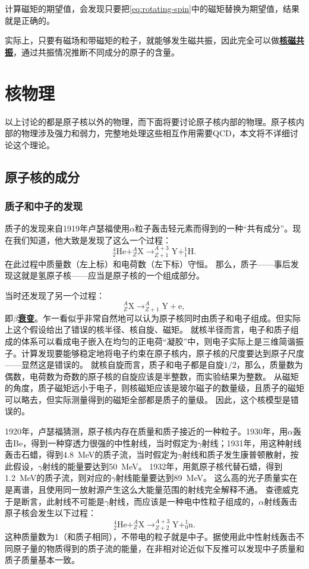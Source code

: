 \documentclass[UTF8, a4paper]{ctexart}
\newcommand*{\nuclear}[3]{^{#2}_{#3}\text{#1}}
\newcommand*{\concept}[1]{\underline{\textbf{#1}}}
\begin{document}
计算磁矩的期望值，会发现只要把\eqref{eq:rotating-spin}中的磁矩替换为期望值，结果就是正确的。

实际上，只要有磁场和带磁矩的粒子，就能够发生磁共振，因此完全可以做\concept{核磁共振}，通过共振情况推断不同成分的原子的含量。

\section{核物理}

以上讨论的都是原子核以外的物理，而下面将要讨论原子核内部的物理。原子核内部的物理涉及强力和弱力，完整地处理这些相互作用需要QCD，本文将不详细讨论这个理论。

\subsection{原子核的成分}

\subsubsection{质子和中子的发现}

质子的发现来自1919年卢瑟福使用$\alpha$粒子轰击轻元素而得到的一种“共有成分”。现在我们知道，他大致是发现了这么一个过程：
\[
    \nuclear{He}{4}{2} + \nuclear{X}{A}{Z} \longrightarrow \nuclear{Y}{A+3}{Z+1} + \nuclear{H}{1}{1}.
\]
在此过程中质量数（左上标）和电荷数（左下标）守恒。
那么，质子——事后发现这就是氢原子核——应当是原子核的一个组成部分。

当时还发现了另一个过程：
\[
    \nuclear{X}{A}{Z} \longrightarrow \nuclear{Y}{A}{Z+1} + \text{e},
\]
即\concept{$\beta$衰变}。乍一看似乎非常自然地可以认为原子核同时由质子和电子组成。但实际上这个假设给出了错误的核半径、核自旋、磁矩。
就核半径而言，电子和质子组成的体系可以看成电子嵌入在均匀的正电荷“凝胶”中，则电子实际上是三维简谐振子。计算发现要能够稳定地将电子约束在原子核内，原子核的尺度要达到原子尺度——显然这是错误的。
就核自旋而言，质子和电子都是自旋$1/2$，那么，质量数为偶数，电荷数为奇数的原子核的自旋应该是半整数，而实验结果为整数。
从磁矩的角度，质子磁矩远小于电子，则核磁矩应该是玻尔磁子的数量级，且质子的磁矩可以略去，但实际测量得到的磁矩全部都是质子的量级。
因此，这个核模型是错误的。

1920年，卢瑟福猜测，原子核内存在质量和质子接近的一种粒子。1930年，用$\alpha$轰击Be，得到一种穿透力很强的中性射线，当时假定为$\gamma$射线；1931年，用这种射线轰击石蜡，得到\SI{4.8}{MeV}的质子流，当时假定为$\gamma$射线和质子发生康普顿散射，按此假设，$\gamma$射线的能量要达到\SI{50}{MeV}。
1932年，用氮原子核代替石蜡，得到\SI{1.2}{MeV}的质子流，则对应的$\gamma$射线能量要达到\SI{89}{MeV}。
这么高的光子质量实在是离谱，且使用同一放射源产生这么大能量范围的射线完全解释不通。
查德威克于是断言，此射线不可能是$\gamma$射线，而应该是一种电中性粒子组成的，$\alpha$射线轰击原子核会发生以下过程：
\[
    \nuclear{He}{4}{2} + \nuclear{X}{A}{Z} \longrightarrow \nuclear{Y}{A+3}{Z+2} + \nuclear{n}{1}{0}.
\]
这种质量数为1（和质子相同），不带电的粒子就是中子。据使用此中性射线轰击不同原子量的物质得到的质子流的能量，在非相对论近似下反推可以发现中子质量和质子质量基本一致。
\end{document}
